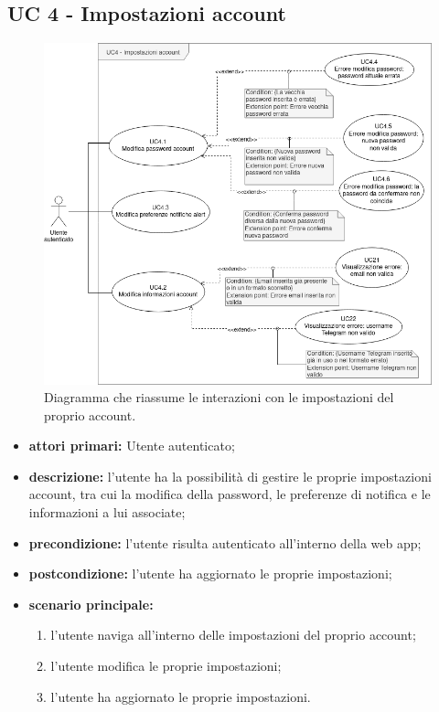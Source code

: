 	\subsection{UC 4 - Impostazioni account}
		
		\begin{figure}[H]
			\centering
			\includegraphics[scale=0.60]{res/images/uc4}
			\caption{Diagramma che riassume le interazioni con le impostazioni del proprio account.}
		\end{figure}
		
		\begin{itemize}
			\item \textbf{attori primari:} Utente autenticato;
			\item \textbf{descrizione:} l'utente ha la possibilità di gestire le proprie impostazioni account, tra cui la modifica della password, le preferenze di notifica e le informazioni a lui associate;
			\item \textbf{precondizione:} l'utente risulta autenticato all'interno della web app;
			\item \textbf{postcondizione:} l'utente ha aggiornato le proprie impostazioni;
			\item \textbf{scenario principale:}
			\begin{enumerate}
				\item{l'utente naviga all'interno delle impostazioni del proprio account;}
				\item{l'utente modifica le proprie impostazioni;}
				\item{l'utente ha aggiornato le proprie impostazioni.}
			\end{enumerate}	
		\end{itemize}
			

